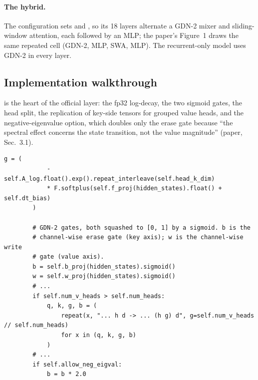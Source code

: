 \paragraph{The hybrid.} The configuration  sets  and
, so its 18 layers alternate a GDN-2 mixer and sliding-window attention,
each followed by an MLP; the paper's Figure~1 draws the same repeated cell (GDN-2, MLP, SWA, MLP).
The recurrent-only model  uses GDN-2 in every layer.

\subsection{Implementation walkthrough}\label{sec:c05-gdn2-impl}

 is the heart of the official layer: the fp32 log-decay, the two sigmoid
gates, the head split, the replication of key-side tensors for grouped value heads, and the
negative-eigenvalue option, which doubles only the erase gate because ``the spectral effect
concerns the state transition, not the value magnitude'' (paper, Sec.~3.1).

\begin{lstlisting}[caption={Excerpt from \texttt{repos/\allowbreak{}NVlabs\_\_GatedDeltaNet-2/\allowbreak{}lit\_gpt/\allowbreak{}gdn2.py} (gates of \texttt{GatedDeltaNet2.forward})},label={lst:c05-gdn2-layer}]
        g = (
            -self.A_log.float().exp().repeat_interleave(self.head_k_dim)
            * F.softplus(self.f_proj(hidden_states).float() + self.dt_bias)
        )

        # GDN-2 gates, both squashed to [0, 1] by a sigmoid. b is the
        # channel-wise erase gate (key axis); w is the channel-wise write
        # gate (value axis).
        b = self.b_proj(hidden_states).sigmoid()
        w = self.w_proj(hidden_states).sigmoid()
        # ...
        if self.num_v_heads > self.num_heads:
            q, k, g, b = (
                repeat(x, "... h d -> ... (h g) d", g=self.num_v_heads // self.num_heads)
                for x in (q, k, g, b)
            )
        # ...
        if self.allow_neg_eigval:
            b = b * 2.0
\end{lstlisting}

